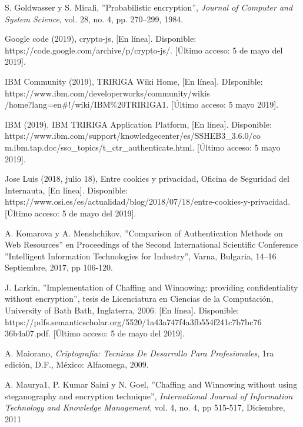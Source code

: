\documentclass[12pt, a4paper, titlepage]{report}
\begin{document}
\begin{thebibliography}{20}
		S.  Goldwasser y S. Micali, ''Probabilistic encryption'', \textit{Journal  of Computer and System Science}, vol. 28, no. 4, pp. 270–299, 1984.
		
        Google code (2019), crypto-js, [En línea]. Disponible: https://code.google.com/archive/p/crypto-js/. [Último acceso: 5 de mayo del 2019].
		
        IBM Community (2019), TRIRIGA Wiki Home, [En línea]. DIsponible: 	https://www.ibm.com/developerworks/community/wikis\\
        /home?lang=en\#!/wiki/IBM\%20TRIRIGA1. [Último acceso: 5 mayo 2019].
        
        IBM (2019), IBM TRIRIGA Application Platform, [En línea]. Disponible: https://www.ibm.com/support/knowledgecenter/es/SSHEB3\_3.6.0/co m.ibm.tap.doc/sso\_topics/t\_ctr\_authenticate.html. [Último acceso: 5 mayo 2019].
		
		Jose Luis (2018, julio 18), Entre cookies y privacidad,  Oficina de Seguridad del Internauta, [En línea]. Disponible: https://www.osi.es/es/actualidad/blog/2018/07/18/entre-cookies-y-privacidad. [Último acceso: 5 de mayo del 2019].
		
	    A. Komarova y A. Menshchikov, ''Comparison of Authentication Methods on Web Resources'' en Proceedings of the Second International Scientific Conference ''Intelligent Information Technologies for Industry'', Varna, Bulgaria, 14–16 Septiembre, 2017, pp 106-120.
	    
    	J. Larkin, ''Implementation of Chaffing and Winnowing: providing confidentiality without encryption'', tesis de Licenciatura en Ciencias de la Computación, University of Bath Bath, Inglaterra, 2006. [En línea]. Disponible: 
    	https://pdfs.semanticscholar.org/5520/1a43a747f4a3fb554f241c7b7bc76 36b4a07.pdf. [Último acceso: 5 de mayo del 2019].
		
        A. Maiorano, \textit{Criptografia: Tecnicas De Desarrollo Para Profesionales}, 1ra edición, D.F., México: Alfaomega, 2009.
		
    	A. Maurya1, P. Kumar Saini y N. Goel, ''Chaffing and Winnowing without using steganography and encryption technique'', \textit{International Journal of Information Technology and Knowledge Management}, vol. 4, no. 4, pp 515-517, Diciembre, 2011
		

\end{thebibliography}
\end{document}
